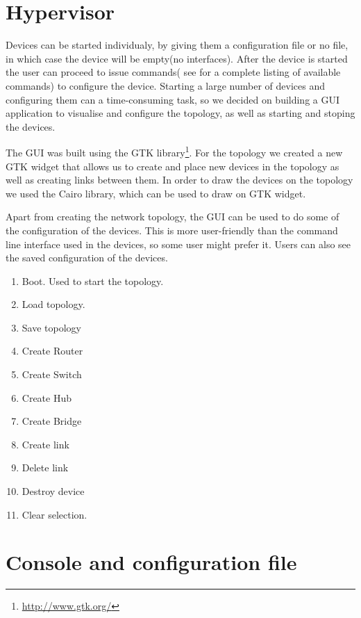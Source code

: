 \section{Hypervisor}
\label{sec:hypervisor2}

Devices can be started individualy, by giving them a configuration file or no file, in which case the device
will be empty(no interfaces). After the device is started the user can proceed to issue commands( see  
for a complete listing of available commands) to configure the device. Starting a large number of
devices and configuring them can a time-consuming task, so we decided on building a GUI application to visualise and configure
the topology, as well as starting and stoping the devices.



The GUI was built using the GTK library\footnote{\url{http://www.gtk.org/}}. For the topology we created a new GTK widget
that allows us to create and place new devices in the topology as well as creating links between them. In order to draw
the devices on the topology we used the Cairo library, which can be used to draw on GTK widget.

Apart from creating the network topology, the GUI can be used to do some of the configuration of the devices. This is 
more user-friendly than the command line interface used in the devices, so some user might prefer it. Users can also see
the saved configuration of the devices.

\begin{enumerate}
  \item Boot. Used to start the topology. 
  \item Load topology. 
  \item Save topology
  \item Create Router
  \item Create Switch
  \item Create Hub
  \item Create Bridge
  \item Create link
  \item Delete link
  \item Destroy device
  \item Clear selection. 
\end{enumerate}

\section{Console and configuration file}
\label{sec:dev-conf}

